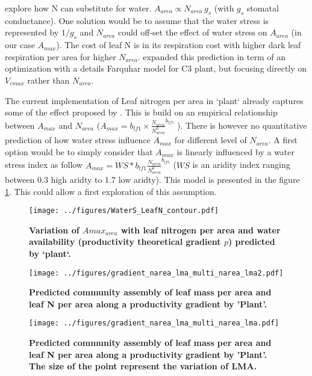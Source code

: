\documentclass[a4paper,11pt]{article}
\begin{document}
 \citet{Wright-2003} explore how N can substitute for water. $A_{area} \propto N_{area} \, g_s$ (with $g_s$ stomatal conductance). One solution would be to assume that the water stress is represented by $1/g_s$ and $N_{area}$ could off-set the effect of water stress on $A_{area}$ (in our case $A_{max}$). The cost of leaf N is in its respiration cost with higher dark leaf respiration per area for higher $N_{area}$. \citet{Prentice-2014} expanded this prediction in term of an optimization with a details Farquhar model for C3 plant, but focusing directly on $V_{cmax}$ rather than $N_{area}$.

 The current implementation of Leaf nitrogen per area in `plant` already captures some of the effect proposed by \citet{Wright-2003}. This is build on an empirical relationship between $A_{max}$ and $N_{area}$ 
($A_{max} = b_{lf1} \times \frac{N_{area}}{N^0_{area}}^{b_{lf5}}$ \citep{Falster-2016}). There is however no quantitative prediction of how water stress influence $A_{max}$ for different level of $N_{area}$. A first option would be to simply consider that $A_{max}$ is linearly influenced by a water stress index  as follow $A_{max} = WS * b_{lf1} \frac{N_{area}}{N^0_{area}}^{b_{lf5}}$ ($WS$ is an aridity index ranging between 0.3 high aridty to 1.7 low aridty). This model is presented in the figure \ref{fig:leafN_water}. This could allow a first exploration of this assumption. 


\begin{figure}[ht]
\centering
\texttt{[image: ../figures/WaterS\_LeafN\_contour.pdf]}
\caption{\textbf{Variation of $A{max}_{area}$ with leaf nitrogen per area and water availability (productivity theoretical gradient $p$) predicted by `plant`.}
\label{fig:leafN_water}}
\end{figure}


\begin{figure}[ht]
\centering
\texttt{[image: ../figures/gradient\_narea\_lma\_multi\_narea\_lma2.pdf]}
\caption{\textbf{Predicted community assembly of leaf mass per area and leaf N per area along a productivity gradient by 'Plant'.}
\label{fig:lma_mat_o_map}}
\end{figure}

\begin{figure}[ht]
\centering
\texttt{[image: ../figures/gradient\_narea\_lma\_multi\_narea\_lma.pdf]}
\caption{\textbf{Predicted community assembly of leaf mass per area and leaf N per area along a productivity gradient by 'Plant'. The size of the point represent the variation of LMA.}
\label{fig:lma_mat_o_map}}
\end{figure}
\end{document}
